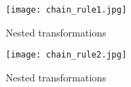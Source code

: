 \documentclass[11pt]{article}
\begin{document}
\begin{figure}
    \texttt{[image: chain\_rule1.jpg]}
    \caption{Nested transformations}
    \label{fig:nested_transformations}
\end{figure}
\begin{figure}
    \texttt{[image: chain\_rule2.jpg]}
    \caption{Nested transformations}
    \label{fig:chain_rule2}
\end{figure}
\end{document}
